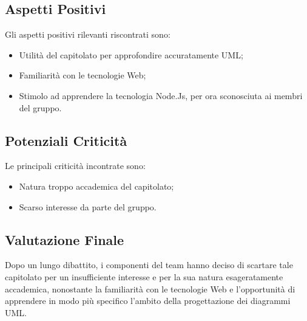 \subsection{Aspetti Positivi}
	Gli aspetti positivi rilevanti riscontrati sono:
	\begin{itemize}
		\item Utilità del capitolato per approfondire accuratamente UML;
		\item Familiarità con le tecnologie Web;
		\item Stimolo ad apprendere la tecnologia Node.Js, per ora sconosciuta ai membri del gruppo.
	\end{itemize}

\subsection{Potenziali Criticità}
	Le principali criticità incontrate sono:
	\begin{itemize}
		\item Natura troppo accademica del capitolato;
		\item Scarso interesse da parte del gruppo.
	\end{itemize}

\subsection{Valutazione Finale}
	Dopo un lungo dibattito, i componenti del team hanno deciso di scartare tale capitolato per un insufficiente interesse e per la sua natura esageratamente accademica, nonostante la familiarità con le tecnologie Web e l'opportunità di apprendere in modo più specifico l'ambito della progettazione dei diagrammi UML. 
	
